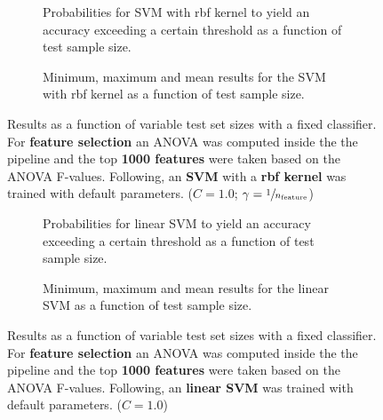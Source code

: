 \begin{figure}
    \captionsetup[subfigure]{justification=justified,singlelinecheck=false}
    \begin{subfigure}[t]{0.61\textwidth}
        
        \caption{Probabilities for SVM with rbf kernel to yield an accuracy exceeding a certain threshold as a function of test sample size.}
    \end{subfigure}
    \hspace{3.0mm}
    \begin{subfigure}[t]{0.34\textwidth}
        
        \caption{Minimum, maximum and mean results for the SVM with rbf kernel as a function of test sample size.}
    \end{subfigure}
    \caption[Effects of varying test sample size. SVM (kernel = rbf); Preprocessing: ANOVA feature selection ($k_\text{best} = \num{1000}$)]{Results as a function of variable test set sizes with a fixed classifier. For \textbf{feature selection} an ANOVA was computed inside the the pipeline and the top \textbf{\num{1000} features} were taken based on the ANOVA F-values. Following, an \textbf{{SVM}} with a \textbf{{rbf kernel}} was trained with default parameters. ($C=\num{1.0}$; $\gamma=\sfrac{1}{n_\text{feature}}$)}
    \label{fig:no_PCA_1000_best_selected_SVC}
\end{figure}

\begin{figure}
    \captionsetup[subfigure]{justification=justified,singlelinecheck=false}
    \begin{subfigure}[t]{0.61\textwidth}
        
        \caption{Probabilities for linear SVM to yield an accuracy exceeding a certain threshold as a function of test sample size.}
    \end{subfigure}
    \hspace{3.0mm}
    \begin{subfigure}[t]{0.34\textwidth}
        
        \caption{Minimum, maximum and mean results for the linear SVM as a function of test sample size.}
    \end{subfigure}
    \caption[Effects of varying test sample size. Linear SVM; Preprocessing: ANOVA feature selection ($k_\text{best} = \num{1000}$)]{Results as a function of variable test set sizes with a fixed classifier. For \textbf{feature selection} an ANOVA was computed inside the the pipeline and the top \textbf{\num{1000} features} were taken based on the ANOVA F-values. Following, an \textbf{{linear SVM}} was trained with default parameters. ($C=\num{1.0}$)}
    \label{fig:no_PCA_1000_best_selected_LinearSVC}
\end{figure}

